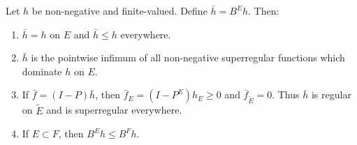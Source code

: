 Let $h$ be non-negative and finite-valued. Define $\bar{h} = B^E h$. Then:
\begin{enumerate}
\item $\bar{h} = h$ on $E$ and $\bar{h} \leq h$ everywhere.
\item $\bar{h}$ is the pointwise infimum of all non-negative superregular functions which dominate $h$ on $E$.
\item If $\bar{f} = (I - P)\bar{h}$, then $\bar{f}_E = (I - P^E)h_E \geq 0$ and $\bar{f}_{\tilde{E}} = 0$. Thus $\bar{h}$ is regular on $\tilde{E}$ and is superregular everywhere.
\item If $E \subset F$, then $B^E h \leq B^F h$.
\end{enumerate}
